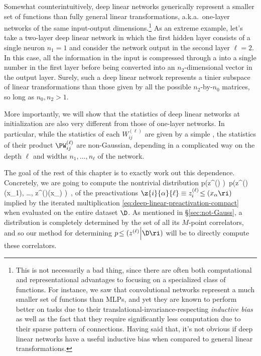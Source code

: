 Somewhat counterintuitively, deep linear networks generically represent a smaller set of functions than fully general linear transformations, a.k.a.~one-layer networks of the same input-output dimensions.\footnote{This is not necessarily a bad thing, since there are often both computational and representational advantages to focusing on a specialized class of functions. For instance, we saw that convolutional networks represent a much smaller set of functions than MLPs, and yet they are known to perform better on  tasks due to their translational-invariance-respecting \emph{inductive bias} %
as well as the fact that they require significantly less computation due to their sparse pattern of connections.
Having said that, it's not obvious if deep linear networks have a useful inductive bias when compared to general linear transformations.
} As an extreme example, let's take a two-layer deep linear network in which the first hidden layer consists of a single neuron $n_1=1$ and consider the network output in the second layer $\ell=2$. 
In this case, all the information in the input is compressed through a  into a single number in the first layer before being converted into an $n_2$-dimensional vector in the output layer. Surely, 
such a deep linear network represents a
tinier subspace of linear transformations than those given by all the possible $n_2$-by-$n_0$ matrices, so long as $n_0, n_2 > 1$.

More importantly, we will show that the statistics of deep linear networks at initialization are also very different from those of one-layer networks.
In particular, while the statistics of each $W_{i j}^{(\ell)}$ are given by a simple , the statistics of their product $\PW_{ij}^{(\ell)}$ are non-Gaussian, depending in a complicated way on the depth $\ell$ and widths $n_{1},\ldots,n_{\ell}$ of the network. 


The goal of the rest of this chapter is to exactly work out this dependence. Concretely, we are going to compute the nontrivial distribution
\be
p\!\le(z^{(\ell)} \Big\vert \D\ri)\,  \equiv p\!\le(z^{(\ell)}\le(x_1\ri), \ldots, z^{(\ell)}\le(x_{\ND}\ri) \ri)\, ,%
\ee
of the preactivations $\z{i}{\alpha}{\ell}\equiv z_{i}^{(\ell)}\!\le(x_\alpha \ri)$
implied by the iterated multiplication \eqref{eq:deep-linear-preactivation-compact}
when evaluated on the entire dataset $\D$.
As mentioned in \S\ref{sec:not-Gauss}, a distribution is completely determined by the set of all its $M$-point correlators, and so our method for determining $p\!\le(z^{(\ell)} \Big\vert \D\ri)$ will be to directly compute these correlators.


